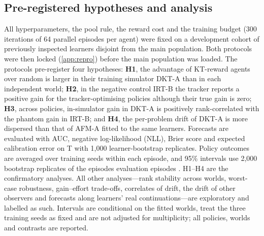 \subsection{Pre-registered hypotheses and analysis}\label{sec:protocol}

All hyperparameters, the pool rule, the reward cost and the training budget (300 iterations of 64 parallel episodes per agent) were fixed on a development cohort of previously inspected learners disjoint from the main population. Both protocols were then locked (\ref{app:repro}) before the main population was loaded. The protocols pre-register four hypotheses: \textbf{H1}, the advantage of KT-reward agents over random is larger in their training simulator DKT-A than in each independent world; \textbf{H2}, in the negative control IRT-B the tracker reports a positive gain for the tracker-optimising policies although their true gain is zero; \textbf{H3}, across policies, in-simulator gain in DKT-A is positively rank-correlated with the phantom gain in IRT-B; and \textbf{H4}, the per-problem drift of DKT-A is more dispersed than that of AFM-A fitted to the same learners. Forecasts are evaluated with AUC, negative log-likelihood (NLL), Brier score and expected calibration error on T with 1,000 learner-bootstrap replicates. Policy outcomes are averaged over training seeds within each episode, and 95\% intervals use 2,000 bootstrap replicates of the {{episodes}} evaluation episodes \citep{efron1993bootstrap}. H1--H4 are the confirmatory analyses. All other analyses---rank stability across worlds, worst-case robustness, gain--effort trade-offs, correlates of drift, the drift of other observers and forecasts along learners' real continuations---are exploratory and labelled as such. Intervals are conditional on the fitted worlds, treat the three training seeds as fixed and are not adjusted for multiplicity; all policies, worlds and contrasts are reported.
